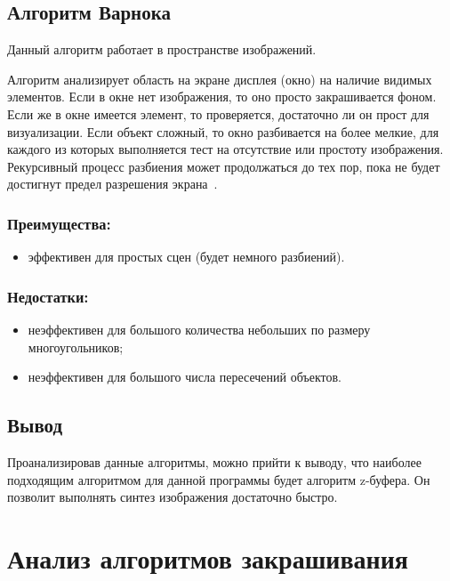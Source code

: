 \subsection{Алгоритм Варнока}

Данный алгоритм работает в пространстве изображений. 

Алгоритм анализирует область на экране дисплея (окно) на наличие видимых элементов. Если в окне нет изображения, то оно просто закрашивается фоном. Если же в окне имеется элемент, то проверяется, достаточно ли он прост для визуализации. Если объект сложный, то окно разбивается на более мелкие, для каждого из которых выполняется тест на отсутствие или простоту изображения. Рекурсивный процесс разбиения может продолжаться до тех пор, пока не будет достигнут предел разрешения экрана~\cite{varnok}.

 
\subsubsection*{Преимущества:}
\begin{itemize}[label=---]
	\item эффективен для простых сцен (будет немного разбиений).
\end{itemize}

\subsubsection*{Недостатки:}
 \begin{itemize}[label=---]
	\item неэффективен для большого количества небольших по размеру многоугольников;
	\item неэффективен для большого числа пересечений объектов.
\end{itemize}
 
 
\subsection{Вывод}

Проанализировав данные алгоритмы, можно прийти к выводу, что наиболее подходящим алгоритмом для данной программы будет алгоритм z-буфера. Он позволит выполнять синтез изображения достаточно быстро.


\section{Анализ алгоритмов закрашивания}

